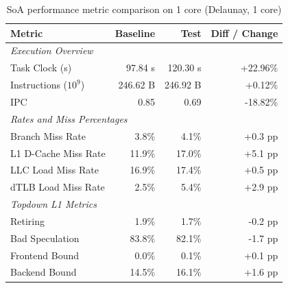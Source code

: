 \documentclass[leqno,11pt]{article}
\begin{document}
        \begin{table}[htbp]
      \centering
      \caption{SoA performance metric comparison on 1 core (Delaunay, 1 core)}
      \label{tab:perf_comparison_soa_delaunay_1core}
      \begin{tabular}{lrrr}
        \toprule
        \textbf{Metric} & \textbf{Baseline} & \textbf{Test} & \textbf{Diff / Change} \\
        \midrule
        \multicolumn{4}{l}{\textit{Execution Overview}} \\
        \quad Task Clock (s)           & 97.84 s   & 120.30 s   & +22.96\%   \\
        \quad Instructions ($10^9$)    & 246.62 B  & 246.92 B  & +0.12\%   \\
        \quad IPC                      & 0.85       & 0.69       & -18.82\%    \\
        \midrule
        \multicolumn{4}{l}{\textit{Rates and Miss Percentages}} \\
        \quad Branch Miss Rate         & 3.8\%      & 4.1\%      & +0.3 pp     \\
        \quad L1 D-Cache Miss Rate     & 11.9\%      & 17.0\%      & +5.1 pp    \\
        \quad LLC Load Miss Rate       & 16.9\%     & 17.4\%     & +0.5 pp    \\
        \quad dTLB Load Miss Rate      & 2.5\%      & 5.4\%      & +2.9 pp     \\
        \midrule
        \multicolumn{4}{l}{\textit{Topdown L1 Metrics}} \\
        \quad Retiring                 & 1.9\%      & 1.7\%      & -0.2 pp    \\
        \quad Bad Speculation          & 83.8\%     & 82.1\%     & -1.7 pp   \\
        \quad Frontend Bound           & 0.0\%      & 0.1\%      & +0.1 pp    \\
        \quad Backend Bound            & 14.5\%      & 16.1\%      & +1.6 pp    \\
        \bottomrule
      \end{tabular}
    \end{table}
\end{document}
